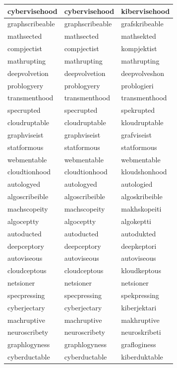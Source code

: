 \documentclass[10pt,twocolumn,letterpaper]{article}
\begin{document}
\begin{longtable}{|p{4cm}|p{4cm}|p{4cm}|}
cybervisehood & cybervisehood & kibervisehood \\ \hline
graphscribeable & graphscribeable & grafskribeable \\ \hline
mathsected & mathsected & mathsekted \\ \hline
compjectist & compjectist & kompjektist \\ \hline
mathrupting & mathrupting & mathrupting \\ \hline
deepvolvetion & deepvolvetion & deepvolveshon \\ \hline
problogyery & problogyery & problogieri \\ \hline
transmenthood & transmenthood & transmenthood \\ \hline
specrupted & specrupted & spekrupted \\ \hline
cloudruptable & cloudruptable & kloudruptable \\ \hline
graphviseist & graphviseist & grafviseist \\ \hline
statformous & statformous & statformous \\ \hline
webmentable & webmentable & webmentable \\ \hline
cloudtionhood & cloudtionhood & kloudshonhood \\ \hline
autologyed & autologyed & autologied \\ \hline
algoscribeible & algoscribeible & algoskribeible \\ \hline
machscopeity & machscopeity & makhskopeiti \\ \hline
algoceptty & algoceptty & algokeptti \\ \hline
autoducted & autoducted & autodukted \\ \hline
deepceptory & deepceptory & deepkeptori \\ \hline
autoviseous & autoviseous & autoviseous \\ \hline
cloudceptous & cloudceptous & kloudkeptous \\ \hline
netsioner & netsioner & netsioner \\ \hline
specpressing & specpressing & spekpressing \\ \hline
cyberjectary & cyberjectary & kiberjektari \\ \hline
machruptive & machruptive & makhruptive \\ \hline
neuroscribety & neuroscribety & neuroskribeti \\ \hline
graphlogyness & graphlogyness & grafloginess \\ \hline
cyberductable & cyberductable & kiberduktable \\ \hline

\end{longtable}
\end{document}
